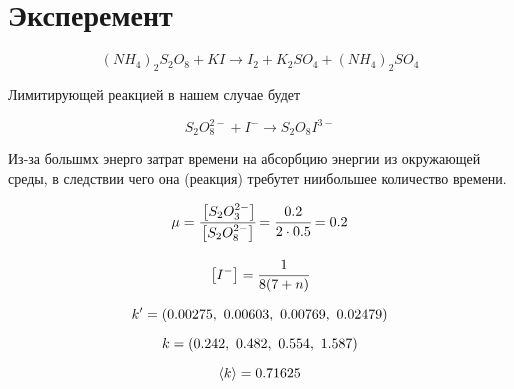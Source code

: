 \section{Эксперемент}

\begin{equation} 
    (NH_4)_2S_2O_8 + KI \xrightarrow{} 
    I_2 + K_2SO_4 + (NH_4)_2SO_4 
\end{equation} 

Лимитирующей реакцией в нашем случае будет 

\begin{equation} 
  S_2O_8^{2 -} + I^{ -} \xrightarrow{} S_2O_8I^{3 -} 
\end{equation} 

Из-за большмх энерго затрат времени на абсорбцию энергии
из окружающей среды, в следствии чего она (реакция)
требутет ниибольшее количество времени.



\begin{equation} 
 \mu = \cfrac{\left[ S_2O_3^{2 -} \right]}{\left[ S_2O_8^{2 -} \right]} = 
 \cfrac{0.2}{2\cdot 0.5} = 0.2
\end{equation} 

\begin{equation} 
 \left[ I^ -  \right] =  \cfrac{1}{8(7 + n)}
\end{equation} 

\begin{equation} 
 k' = \inner{0.00275, \ 0.00603, \ 0.00769, \ 0.02479}
\end{equation} 

\begin{equation} 
  k = \inner{0.242, \ 0.482, \ 0.554, \ 1.587}
\end{equation} 

\begin{equation} 
 \left\langle k \right\rangle = 0.71625 
\end{equation} 

